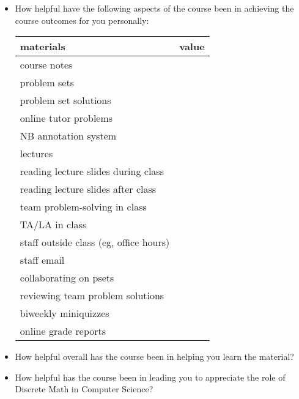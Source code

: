 \documentclass[handout]{mcs}
\begin{document}
\begin{itemize}

\item How helpful have the following aspects of the course been in
achieving the course outcomes for you personally:
\begin{center}

\begin{tabular}{| l | c |}
materials & value\\
\hline  \hline
   course notes          & \hspace{0.7in}\\  \hline
   problem sets          & \\  \hline
   problem set solutions & \\  \hline
   online tutor problems & \\  \hline
   NB annotation system  & \\  \hline
   lectures              & \\  \hline
   reading lecture slides during class    & \\  \hline
   reading lecture slides after class     & \\  \hline
   team problem-solving in class          & \\  \hline
   TA/LA in class        & \\  \hline
   staff outside class (eg, office hours) & \\  \hline
   staff email           &\\ \hline
   collaborating on psets                 & \\  \hline
   reviewing team problem solutions       & \\  \hline
   biweekly miniquizzes                   & \\  \hline
   online grade reports                   & \\  \hline
\end{tabular}
\end{center}

\item How helpful overall has the course been in helping you learn the
material?  \hfill \brule{0.5in}

\item How helpful has the course been in leading you to appreciate the role of
Discrete Math in Computer Science? \hfill \brule{0.5in}

\end{itemize}
\end{document}
